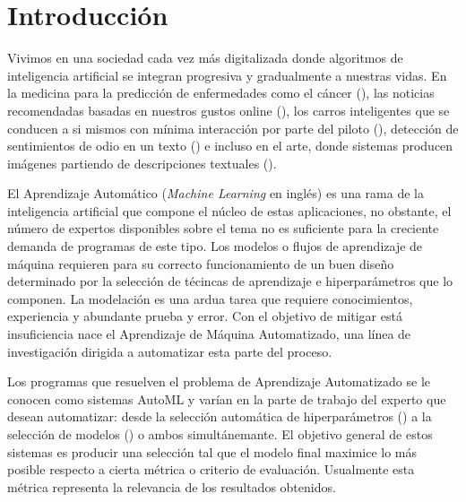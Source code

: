 \chapter*{Introducción}\label{chapter:introduction}
Vivimos en una sociedad cada vez m\'as digitalizada donde algoritmos de inteligencia artificial se integran progresiva y gradualmente a nuestras vidas. En la medicina para la predicci\'on de enfermedades como el c\'ancer (\cite{kourou2015machine}), las noticias  recomendadas basadas en nuestros gustos online (\cite{liu2010personalized}), los carros inteligentes que se conducen a si mismos con m\'inima interacci\'on por parte del piloto (\cite{badue2021self}), detecci\'on de sentimientos de odio en un texto (\cite{fortuna2018survey}) e incluso en el arte, donde sistemas producen im\'agenes partiendo de descripciones textuales (\cite{xu2018attngan}).

El Aprendizaje Autom\'atico (\textit{Machine Learning} en ingl\'es) es una rama de la inteligencia artificial que compone el n\'ucleo de estas aplicaciones, no obstante, el n\'umero de expertos disponibles sobre el tema no es suficiente para la creciente demanda de programas de este tipo. Los modelos o flujos de aprendizaje de m\'aquina requieren para su correcto funcionamiento de un buen dise\~no determinado por la selecci\'on de t\'ecincas de aprendizaje e hiperpar\'ametros que lo componen. La modelaci\'on  es una ardua tarea que requiere conocimientos, experiencia y abundante prueba y error. Con el objetivo de mitigar est\'a insuficiencia nace el Aprendizaje de M\'aquina Automatizado, una l\'inea de investigaci\'on dirigida a automatizar esta parte del proceso.

Los programas que resuelven el problema de Aprendizaje Automatizado se le conocen como sistemas AutoML y var\'ian en la parte de trabajo del experto que desean automatizar: desde la selecci\'on autom\'atica de hiperpar\'ametros (\cite{feurer2019hyperparameter}) a  la selecci\'on de modelos (\cite{thornton2013auto}) o ambos  simult\'anemante. El objetivo general de estos sistemas es producir una selecci\'on tal que el modelo final maximice lo m\'as posible respecto a cierta m\'etrica o criterio de evaluaci\'on. Usualmente esta m\'etrica representa la relevancia de los resultados obtenidos.

